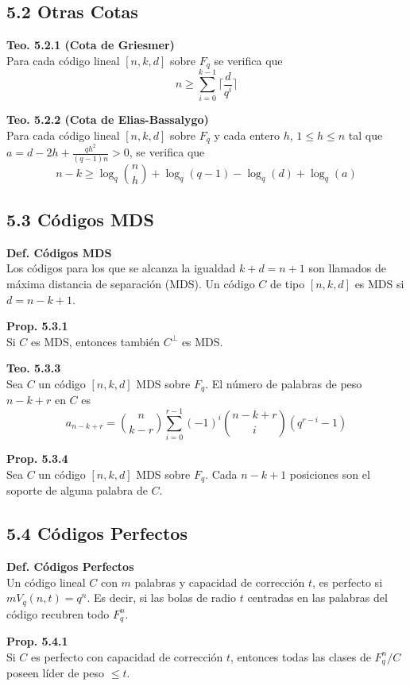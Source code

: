 \documentclass{article}
\begin{document}
\subsection{5.2 Otras Cotas}

\textbf{Teo. 5.2.1 (Cota de Griesmer)}\\
Para cada código lineal $[n, k, d]$ sobre $F_{q}$ se verifica que
\[
n \ge \sum_{i=0}^{k-1} \lceil \frac{d}{q^{i}} \rceil
\]

\textbf{Teo. 5.2.2 (Cota de Elias-Bassalygo)}\\
Para cada código lineal $[n, k, d]$ sobre $F_{q}$ y cada entero $h$, $1 \le h \le n$ tal que $a = d-2h+\frac{qh^{2}}{(q-1)n} > 0$, se verifica que
\[
n-k \ge \log_{q}\binom{n}{h} + \log_{q}(q-1) - \log_{q}(d) + \log_{q}(a)
\]

\subsection{5.3 Códigos MDS}

\textbf{Def. Códigos MDS}\\
Los códigos para los que se alcanza la igualdad $k+d=n+1$ son llamados de máxima distancia de separación (MDS). Un código $C$ de tipo $[n, k, d]$ es MDS si $d=n-k+1$.

\textbf{Prop. 5.3.1}\\
Si $C$ es MDS, entonces también $C^{\perp}$ es MDS.

\textbf{Teo. 5.3.3}\\
Sea $C$ un código $[n, k, d]$ MDS sobre $F_{q}$. El número de palabras de peso $n-k+r$ en $C$ es
\[
a_{n-k+r} = \binom{n}{k-r}\sum_{i=0}^{r-1}(-1)^{i}\binom{n-k+r}{i}(q^{r-i}-1)
\]

\textbf{Prop. 5.3.4}\\
Sea $C$ un código $[n, k, d]$ MDS sobre $F_{q}$. Cada $n-k+1$ posiciones son el soporte de alguna palabra de $C$.

\subsection{5.4 Códigos Perfectos}

\textbf{Def. Códigos Perfectos}\\
Un código lineal $C$ con $m$ palabras y capacidad de corrección $t$, es perfecto si $mV_{q}(n,t)=q^{n}$. Es decir, si las bolas de radio $t$ centradas en las palabras del código recubren todo $F_{q}^{n}$.

\textbf{Prop. 5.4.1}\\
Si $C$ es perfecto con capacidad de corrección $t$, entonces todas las clases de $F_{q}^{n}/C$ poseen líder de peso $\le t$.
\end{document}

